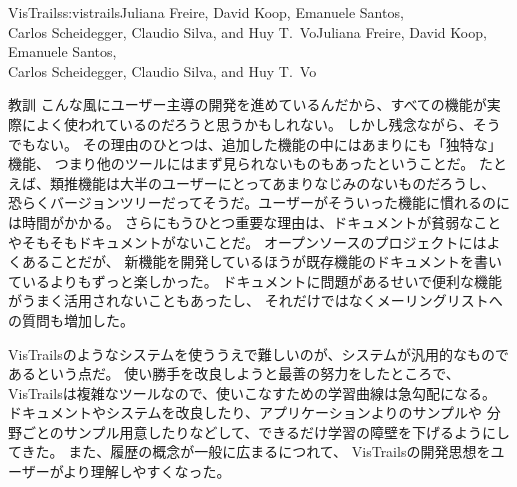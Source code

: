 \begin{aosachaptertoc}{VisTrails}{s:vistrails}{Juliana Freire, David Koop, Emanuele Santos, \\ Carlos Scheidegger, Claudio Silva, and Huy T.\ Vo}{Juliana Freire, David Koop, Emanuele Santos, \\ \hspace*{0.9cm} Carlos Scheidegger, Claudio Silva, and Huy T.\ Vo}
\begin{aosasect1}{教訓}
こんな風にユーザー主導の開発を進めているんだから、すべての機能が実際によく使われているのだろうと思うかもしれない。
しかし残念ながら、そうでもない。
その理由のひとつは、追加した機能の中にはあまりにも「独特な」機能、
つまり他のツールにはまず見られないものもあったということだ。
たとえば、類推機能は大半のユーザーにとってあまりなじみのないものだろうし、
恐らくバージョンツリーだってそうだ。ユーザーがそういった機能に慣れるのには時間がかかる。
さらにもうひとつ重要な理由は、ドキュメントが貧弱なことやそもそもドキュメントがないことだ。
オープンソースのプロジェクトにはよくあることだが、
新機能を開発しているほうが既存機能のドキュメントを書いているよりもずっと楽しかった。
ドキュメントに問題があるせいで便利な機能がうまく活用されないこともあったし、
それだけではなくメーリングリストへの質問も増加した。

VisTrailsのようなシステムを使ううえで難しいのが、システムが汎用的なものであるという点だ。
使い勝手を改良しようと最善の努力をしたところで、
VisTrailsは複雑なツールなので、使いこなすための学習曲線は急勾配になる。
ドキュメントやシステムを改良したり、アプリケーションよりのサンプルや
分野ごとのサンプル用意したりなどして、できるだけ学習の障壁を下げるようにしてきた。
また、履歴の概念が一般に広まるにつれて、
VisTrailsの開発思想をユーザーがより理解しやすくなった。


\end{aosasect1}
\end{aosachaptertoc}

